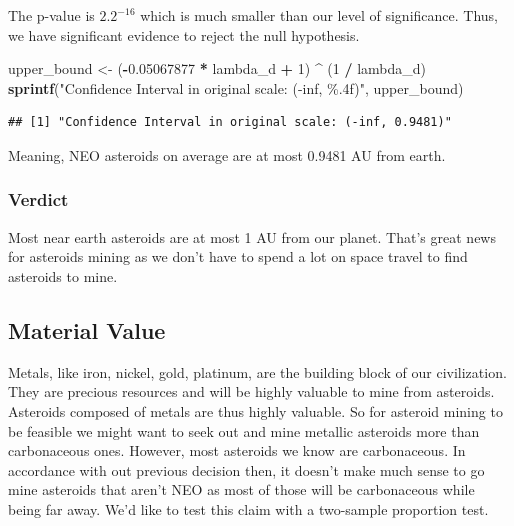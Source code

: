 \documentclass[
]{article}
\newenvironment{Shaded}{\begin{snugshade}}{\end{snugshade}}
\newcommand{\DecValTok}[1]{\textcolor[rgb]{0.00,0.00,0.81}{#1}}
\newcommand{\FloatTok}[1]{\textcolor[rgb]{0.00,0.00,0.81}{#1}}
\newcommand{\FunctionTok}[1]{\textcolor[rgb]{0.13,0.29,0.53}{\textbf{#1}}}
\newcommand{\NormalTok}[1]{#1}
\newcommand{\OtherTok}[1]{\textcolor[rgb]{0.56,0.35,0.01}{#1}}
\newcommand{\SpecialCharTok}[1]{\textcolor[rgb]{0.81,0.36,0.00}{\textbf{#1}}}
\newcommand{\StringTok}[1]{\textcolor[rgb]{0.31,0.60,0.02}{#1}}
\begin{document}
The p-value is \(2.2^{-16}\) which is much smaller than our level of
significance. Thus, we have significant evidence to reject the null
hypothesis.

\begin{Shaded}
\begin{Highlighting}[]
\NormalTok{upper\_bound }\OtherTok{\textless{}{-}}\NormalTok{ (}\SpecialCharTok{{-}}\FloatTok{0.05067877} \SpecialCharTok{*}\NormalTok{ lambda\_d }\SpecialCharTok{+} \DecValTok{1}\NormalTok{) }\SpecialCharTok{\^{}}\NormalTok{ (}\DecValTok{1} \SpecialCharTok{/}\NormalTok{ lambda\_d)}
\FunctionTok{sprintf}\NormalTok{(}\StringTok{"Confidence Interval in original scale: ({-}inf, \%.4f)"}\NormalTok{, upper\_bound)}
\end{Highlighting}
\end{Shaded}

\begin{verbatim}
## [1] "Confidence Interval in original scale: (-inf, 0.9481)"
\end{verbatim}

Meaning, NEO asteroids on average are at most 0.9481 AU from earth.

\hypertarget{verdict}{%
\subsubsection{Verdict}\label{verdict}}

Most near earth asteroids are at most 1 AU from our planet. That's great
news for asteroids mining as we don't have to spend a lot on space
travel to find asteroids to mine.

\hypertarget{material-value}{%
\subsection{Material Value}\label{material-value}}

Metals, like iron, nickel, gold, platinum, are the building block of our
civilization. They are precious resources and will be highly valuable to
mine from asteroids. Asteroids composed of metals are thus highly
valuable. So for asteroid mining to be feasible we might want to seek
out and mine metallic asteroids more than carbonaceous ones. However,
most asteroids we know are carbonaceous. In accordance with out previous
decision then, it doesn't make much sense to go mine asteroids that
aren't NEO as most of those will be carbonaceous while being far away.
We'd like to test this claim with a two-sample proportion test.
\end{document}
